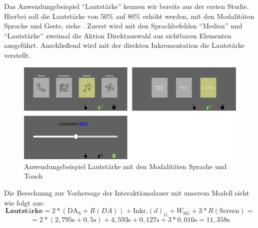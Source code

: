 Das Anwendungsbeispiel "`Lautstärke"' kennen wir bereits aus der ersten Studie. 
Hierbei soll die Lautstärke von 50\% auf 80\% erhöht werden, mit den Modalitäten Sprache und Geste, siehe . 
Zuerst wird mit den Sprachbefehlen "`Medien"' und "`Lautstärke"' zweimal die Aktion Direktauswahl aus sichtbaren Elementen ausgeführt. 
Anschließend wird mit der direkten Inkrementation die Lautstärke verstellt. 
\begin{figure}
	\centering
		\includegraphics[width=1\textwidth]{img/UseCases_Eval_MedienS.jpg}
	\caption{Anwendungsbeispiel Lautstärke mit den Modalitäten Sprache und Touch}
	\label{fig:UseCasesEvalMedienS}
\end{figure}
Die Berechnung zur Vorhersage der Interaktionsdauer mit unserem Modell sieht wie folgt aus:
\[
\textbf{Lautstärke} = 2*(\text{DA}_\text{S} + R(DA)) + \text{Inkr.} (d)_\text{G} + W_\text{SG} + 3*R(\text{Screen}) =
\]
\[
= 2*( 2,795\text{s} + 0,5\text{s}) + 4,593\text{s} + 0,127\text{s} + 3*0,016\text{s} = 11,358 \text{s}
\]

